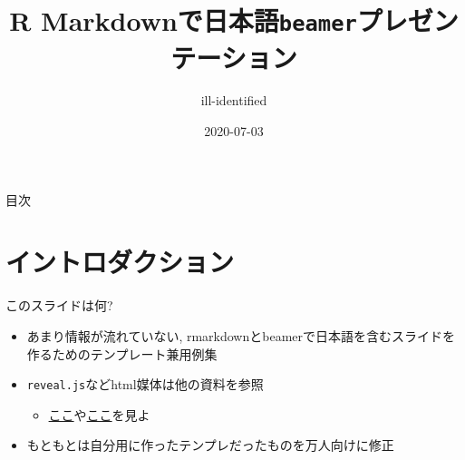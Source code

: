 \documentclass[
  12pt,
  ignorenonframetext,
]{beamer}
\title{R Markdownで日本語\texttt{beamer}プレゼンテーション}
\author{ill-identified}
\date{2020-07-03}
\providecommand{\tightlist}{%
  \setlength{\itemsep}{0pt}\setlength{\parskip}{0pt}}
\begin{document}
\frame{\titlepage}

\begin{frame}{目次}
\protect\hypertarget{ux76eeux6b21}{}

\tableofcontents[hideallsubsections]

\end{frame}

\hypertarget{ux30a4ux30f3ux30c8ux30edux30c0ux30afux30b7ux30e7ux30f3}{%
\section{イントロダクション}\label{ux30a4ux30f3ux30c8ux30edux30c0ux30afux30b7ux30e7ux30f3}}

\begin{frame}[fragile]{このスライドは何?}
\protect\hypertarget{ux3053ux306eux30b9ux30e9ux30a4ux30c9ux306fux4f55}{}

\begin{itemize}
\tightlist
\item
  あまり情報が流れていない,
  rmarkdownとbeamerで日本語を含むスライドを作るためのテンプレート兼用例集
\item
  \texttt{reveal.js}などhtml媒体は他の資料を参照

  \begin{itemize}
  \tightlist
  \item
    \href{https://kazutan.github.io/SappoRoR6/rmd_slide.html\#/}{ここ}や\href{https://kazutan.github.io/fukuokaR11/intro_rmarkdown_d.html}{ここ}を見よ
  \end{itemize}
\item
  もともとは自分用に作ったテンプレだったものを万人向けに修正
\end{itemize}

\end{frame}
\end{document}
